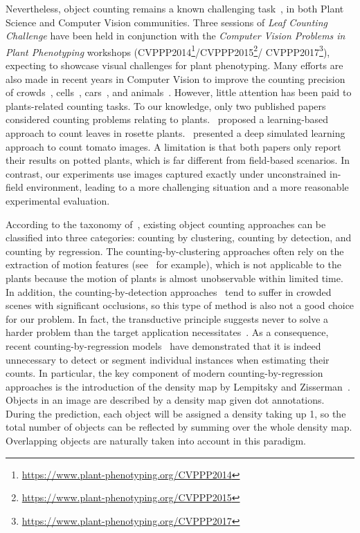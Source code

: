 \documentclass[twocolumn]{bmcart}%
\begin{document}
Nevertheless, object counting remains a known challenging task~\cite{minervini2015image,ali2013modeling}, in both Plant Science and Computer Vision communities. Three sessions of \emph{Leaf Counting Challenge} have been held in conjunction with the \emph{Computer Vision Problems in Plant Phenotyping} workshops (CVPPP2014\footnote{\url{https://www.plant-phenotyping.org/CVPPP2014}}/CVPPP2015\footnote{\url{https://www.plant-phenotyping.org/CVPPP2015}}/ CVPPP2017\footnote{\url{https://www.plant-phenotyping.org/CVPPP2017}}), expecting to showcase visual challenges for plant phenotyping. Many efforts are also made in recent years in Computer Vision to improve the counting precision of crowds~\cite{chan2008privacy,zhang2015cross}, cells~\cite{vlaz2010denlearn,xie2016microscopy}, cars~\cite{arteta2014interactive,onoro2016towards}, and animals~\cite{arteta2016counting}. However, little attention has been paid to plants-related counting tasks. To our knowledge, only two published papers considered counting problems relating to plants.~\cite{giuffrida2015learning} proposed a learning-based approach to count leaves in rosette plants.~\cite{rahnemoonfar2017deep} presented a deep simulated learning approach to count tomato images. A limitation is that both papers only report their results on potted plants, which is far different from field-based scenarios. In contrast, our experiments use images captured exactly under unconstrained in-field environment, leading to a more challenging situation and a more reasonable experimental evaluation.

According to the taxonomy of~\cite{loy2013crowd}, existing object counting approaches can be classified into three categories: counting by clustering, counting by detection, and counting by regression. The counting-by-clustering approaches often rely on the extraction of motion features (see~\cite{rabaud2006counting} for example), which is not applicable to the plants because the motion of plants is almost unobservable within limited time. In addition, the counting-by-detection approaches~\cite{li2008estimating,dollar2012pedestrian} tend to suffer in crowded scenes with significant occlusions, so this type of method is also not a good choice for our problem. In fact, the transductive principle suggests never to solve a harder problem than the target application necessitates~\cite{vapnik1998statistical}. As a consequence, recent counting-by-regression models~\cite{chan2008privacy,vlaz2010denlearn,arteta2014interactive} have demonstrated that it is indeed unnecessary to detect or segment individual instances when estimating their counts. In particular, the key component of modern counting-by-regression approaches is the introduction of the density map by Lempitsky and Zisserman~\cite{vlaz2010denlearn}. Objects in an image are described by a density map given dot annotations. During the prediction, each object will be assigned a density taking up 1, so the total number of objects can be reflected by summing over the whole density map. Overlapping objects are naturally taken into account in this paradigm.
\end{document}
